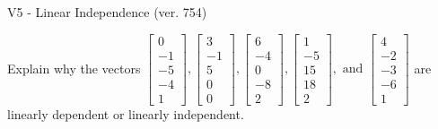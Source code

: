 \begin{exercise}
  \begin{exerciseTitle}V5 - Linear Independence (ver. 754)\end{exerciseTitle}
  \begin{exerciseStatement}
    Explain why the vectors \(\left[\begin{array}{r}
0 \\
-1 \\
-5 \\
-4 \\
1
\end{array}\right] , \left[\begin{array}{r}
3 \\
-1 \\
5 \\
0 \\
0
\end{array}\right] , \left[\begin{array}{r}
6 \\
-4 \\
0 \\
-8 \\
2
\end{array}\right] , \left[\begin{array}{r}
1 \\
-5 \\
15 \\
18 \\
2
\end{array}\right] , \text{ and } \left[\begin{array}{r}
4 \\
-2 \\
-3 \\
-6 \\
1
\end{array}\right]\) are linearly dependent or linearly independent.	



\end{exerciseStatement}
\end{exercise}
